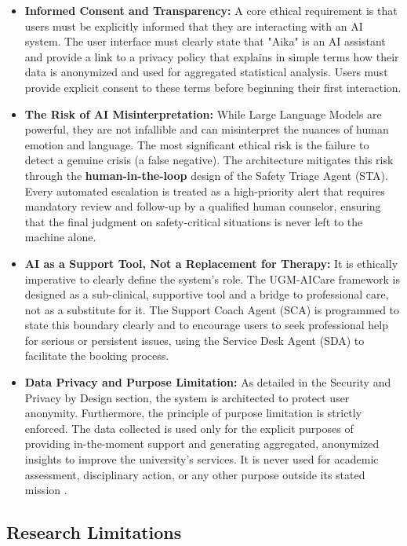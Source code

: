 \begin{itemize}
    \item \textbf{Informed Consent and Transparency:} A core ethical requirement is that users must be explicitly informed that they are interacting with an AI system. The user interface must clearly state that "Aika" is an AI assistant and provide a link to a privacy policy that explains in simple terms how their data is anonymized and used for aggregated statistical analysis. Users must provide explicit consent to these terms before beginning their first interaction.
    \item \textbf{The Risk of AI Misinterpretation:} While Large Language Models are powerful, they are not infallible and can misinterpret the nuances of human emotion and language. The most significant ethical risk is the failure to detect a genuine crisis (a false negative). The architecture mitigates this risk through the \textbf{human-in-the-loop} design of the Safety Triage Agent (STA). Every automated escalation is treated as a high-priority alert that requires mandatory review and follow-up by a qualified human counselor, ensuring that the final judgment on safety-critical situations is never left to the machine alone.
    \item \textbf{AI as a Support Tool, Not a Replacement for Therapy:} It is ethically imperative to clearly define the system's role. The UGM-AICare framework is designed as a sub-clinical, supportive tool and a bridge to professional care, not as a substitute for it. The Support Coach Agent (SCA) is programmed to state this boundary clearly and to encourage users to seek professional help for serious or persistent issues, using the Service Desk Agent (SDA) to facilitate the booking process.
    \item \textbf{Data Privacy and Purpose Limitation:} As detailed in the Security and Privacy by Design section, the system is architected to protect user anonymity. Furthermore, the principle of purpose limitation is strictly enforced. The data collected is used only for the explicit purposes of providing in-the-moment support and generating aggregated, anonymized insights to improve the university's services. It is never used for academic assessment, disciplinary action, or any other purpose outside its stated mission \cite{FIND_CITATION_HERE}.
\end{itemize}

\subsection{Research Limitations}

